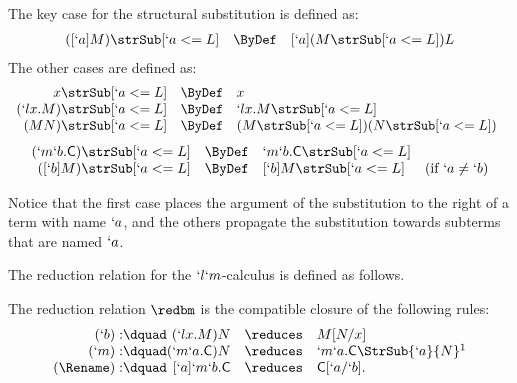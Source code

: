 \documentclass{lmcs}
\begin{document}
 \begin{defi} \label{def:substitution}
The key case for the structural substitution is defined as:
%
%
 \[ \begin{array}{rcl}
([`a]M) \strSub[`a<=L] & \ByDef & [`a](M \strSub[`a<=L])L 
 \end{array} \]
The other cases are defined as:
%
%
 \[ \begin{array}{rcl@{\quad}l}
x \strSub[`a<=L] & \ByDef & x \\
(`lx.M) \strSub[`a<=L] & \ByDef & `lx.M \strSub[`a<=L] \\
(MN) \strSub[`a<=L] & \ByDef & (M \strSub[`a<=L])(N \strSub[`a<=L]) \\
 \end{array} \]
 \[ \begin{array}{rcl@{\quad}l}
(`m`b.\Cmd) \strSub[`a<=L] & \ByDef & `m`b.\Cmd \strSub[`a<=L] \\
([`b]M) \strSub[`a<=L] & \ByDef & [`b]M \strSub[`a<=L] & (\textrm{if }`a \neq`b )
 \end{array} \]
 \end{defi}
Notice that the first case places the argument of the substitution to the right of a term with name $`a$, and the others propagate the substitution towards subterms that are named $`a$.

The reduction relation for the $`l`m$-calculus is defined as follows.

 \begin{defi} \label{def:reduction}
The reduction relation $\redbm$ is the compatible closure of the following rules:
%
%
 \[ \begin{array}{r@{\dquad}rcll}
(`b): & (`lx.M)N & \reduces & M[N/x] \\
(`m): & (`m`a.\Cmd)N & \reduces & `m`a.\Cmd\StrSub{`a}{N} \footnotemark \\
(\Rename): & [`a]`m`b.\Cmd & \reduces & \Cmd[`a/`b] .
 \end{array} \]
 \end{defi}
\end{document}
